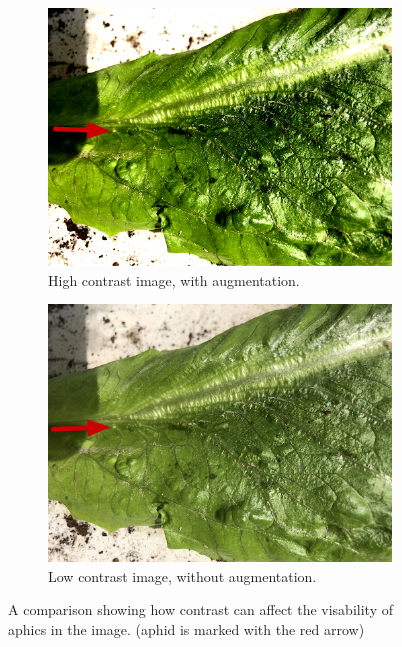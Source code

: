 \documentclass{article}
\begin{document}
\begin{figure}[h]
    \centering
    \begin{subfigure}{0.4\textwidth}
        \centering
        \includegraphics[width=\textwidth]{images/intro_high.png}
        \caption{High contrast image, with augmentation.}
    \end{subfigure}
    \hfill
    \begin{subfigure}{0.4\textwidth}
        \centering
        \includegraphics[width=\textwidth]{images/intro_low.png}
        \caption{Low contrast image, without augmentation.}
    \end{subfigure}
    \caption{A comparison showing how contrast can affect the visability of aphics in the image. (aphid is marked with the red arrow)}
\end{figure}
\end{document}
